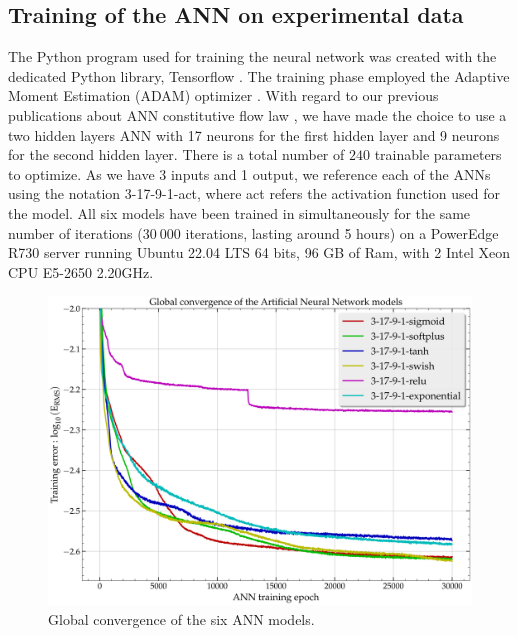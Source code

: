 \documentclass[algorithms,article,submit,pdftex,moreauthors]{Definitions/mdpi}
\begin{document}
\subsection{Training of the ANN on experimental data\label{subsec:train}}

The Python program used for training the neural network was created with the dedicated Python library, Tensorflow \cite{Tensorflow-2015}.
The training phase employed the Adaptive Moment Estimation (ADAM) optimizer \cite{Kingma-2015-AMS}.
With regard to our previous publications about ANN constitutive flow law \cite{Pantale-2021-EIN}, we have made the choice to use a two hidden layers ANN with 17 neurons for the first hidden layer and 9 neurons for the second hidden layer. 
There is a total number of $240$ trainable parameters to optimize.
As we have 3 inputs and 1 output, we reference each of the ANNs using the notation 3-17-9-1-act, where act refers the activation function used for the model.
All six models have been trained in simultaneously for the same number of iterations ($30~000$ iterations, lasting around 5 hours) on a PowerEdge R730 server running Ubuntu 22.04 LTS 64 bits, 96 GB of Ram, with 2 Intel Xeon CPU E5-2650 2.20GHz.


\begin{figure}[h]
\centering
\includegraphics[width=0.8\columnwidth]{Figures/3Cr2Mo-convergence-17-9}
\caption{Global convergence of the six ANN models.}
\label{fig:ANN-conv}
\end{figure}
\end{document}
